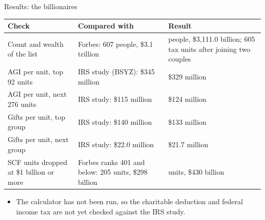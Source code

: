 \begin{frame}{Results: the billionaires}
  \footnotesize
  \centering
  \renewcommand{\arraystretch}{1.1}
  \begin{tabular}{>{\raggedright}p{4.6cm} >{\raggedright}p{4.6cm} >{\raggedright\arraybackslash}p{3.4cm}}
    \toprule
    Check & Compared with & Result \\
    \midrule
    Count and wealth of the list & Forbes: 607 people, \$3.1 trillion & 607 people, \$3,111.0 billion; 605 tax units after joining two couples \\
    AGI per unit, top 92 units & IRS study (BSYZ): \$345 million & \$329 million \\
    AGI per unit, next 276 units & IRS study: \$115 million & \$124 million \\
    Gifts per unit, top group & IRS study: \$140 million & \$133 million \\
    Gifts per unit, next group & IRS study: \$22.0 million & \$21.7 million \\
    SCF units dropped at \$1 billion or more & Forbes ranks 401 and below: 205 units, \$298 billion & 360 units, \$430 billion \\
    \bottomrule
  \end{tabular}
  \raggedright
  \begin{itemize}
    \item The calculator has not been run, so the charitable deduction and federal income tax are not yet checked against the IRS study.
  \end{itemize}
\end{frame}


